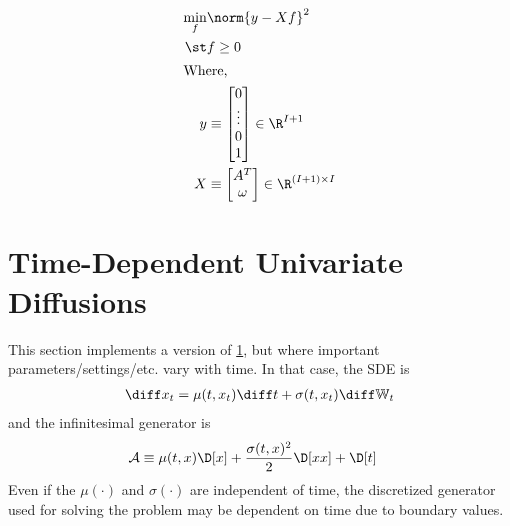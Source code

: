 \documentclass[11pt]{etk-article}
\begin{document}
\begin{align}
	\min_f& \norm{y - X f}^2\\
	\st & f \geq 0\\
	\intertext{Where,}
	y &\equiv \begin{bmatrix}0 \\ \vdots \\ 0 \\ 1\end{bmatrix}\in\R^{I + 1}\\
	X &\equiv \begin{bmatrix}
		A^T\\
		\omega
		\end{bmatrix}\in \R^{(I+1)\times I}
\end{align}

\section{Time-Dependent Univariate Diffusions}\label{sec:time-dependent-univariate-diffusion}
This section implements a version of \cref{sec:time-dependent-univariate-diffusion}, but where important parameters/settings/etc. vary with time.  In that case, the SDE is
\begin{align}
	\diff x_t = \mu(t, x_t)\diff t + \sigma(t, x_t)\diff\mathbb{W}_t\label{eq:x-t-SDE}
\end{align}
and the infinitesimal generator is 
\begin{align}
	\mathcal{A} &\equiv \mu(t,x)\D[x] + \frac{\sigma(t,x)^2}{2}\D[xx] + \D[t]\label{eq:A-generator-univariate-diffusion-t}
\end{align}
Even if the $\mu(\cdot)$ and $\sigma(\cdot)$ are independent of time, the discretized generator used for solving the problem may be dependent on time due to boundary values.



\end{document}
